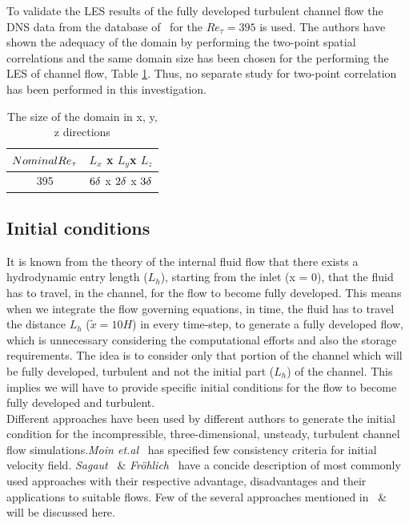 To validate the LES results of the fully developed turbulent channel flow the DNS data from the database of~\cite{moser:kim:mansour:99} for the $Re_\tau = 395$ is used. The authors have shown the adequacy of the domain by performing the two-point spatial correlations and the same domain size has been chosen for the performing the LES of channel flow, Table \ref{Computational Domain}. Thus, no separate study for two-point correlation has been performed in this investigation.
%
\begin{table}[!h]
\centering
\begin{tabular}{c|c}
\hline
$Nominal Re_{\tau}$ & $L_x$ x $L_y $x $L_z$ \\
\hline
%
395   &  $6\delta$ x $2\delta$ x $3\delta$  \\
\hline
\end{tabular}
\caption{The size of the domain in x, y, z directions}
\label{Computational Domain}
\end{table}
%

\subsection{Initial conditions}
It is known from the theory of the internal fluid flow that there exists a hydrodynamic entry length ($L_h$), starting from the inlet (x = 0), that the fluid has to travel, in the channel, for the flow to become fully developed. This means when we integrate the flow governing equations, in time, the fluid has to travel the distance $L_h$ ($\tilde{x} =10H$) in every time-step, to generate a fully developed flow, which is unnecessary considering the computational efforts and also the storage requirements. The idea is to consider only that portion of the channel which will be fully developed, turbulent and not the initial part ($L_h$) of the channel. This implies we will have to provide specific initial conditions for the flow to become fully developed and turbulent.\\
%
Different approaches have been used by different authors to generate the initial condition for the incompressible, three-dimensional, unsteady, turbulent channel flow simulations.\emph{Moin et.al}~\cite{Moin:78} has specified few consistency criteria for initial velocity field. \emph{Sagaut}~\cite{sagaut:02} \& \emph{Fröhlich}~\cite{froehlich:book} have a concide description of most commonly used approaches with their respective advantage, disadvantages and their applications to suitable flows. Few of the several approaches mentioned in~\cite{sagaut:02} \& ~\cite{froehlich:book} will be discussed here.


